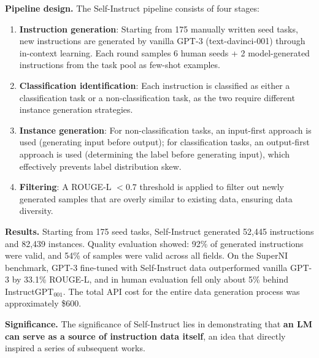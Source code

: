 \textbf{Pipeline design.}
The Self-Instruct pipeline consists of four stages:
\begin{enumerate}[leftmargin=1.5em]
  \item \textbf{Instruction generation}:
    Starting from 175 manually written seed tasks, new instructions are generated by
    vanilla GPT-3 (text-davinci-001) through in-context learning.
    Each round samples 6 human seeds + 2 model-generated instructions from the task pool as few-shot examples.

  \item \textbf{Classification identification}:
    Each instruction is classified as either a classification task or a non-classification task,
    as the two require different instance generation strategies.

  \item \textbf{Instance generation}:
    For non-classification tasks, an input-first approach is used (generating input before output);
    for classification tasks, an output-first approach is used (determining the label before generating input),
    which effectively prevents label distribution skew.

  \item \textbf{Filtering}:
    A ROUGE-L $< 0.7$ threshold is applied to filter out newly generated samples that are overly similar to existing data,
    ensuring data diversity.
\end{enumerate}

\textbf{Results.}
Starting from 175 seed tasks, Self-Instruct generated 52,445 instructions and 82,439 instances.
Quality evaluation showed: 92\% of generated instructions were valid, and 54\% of samples were valid across all fields.
On the SuperNI benchmark, GPT-3 fine-tuned with Self-Instruct data
outperformed vanilla GPT-3 by 33.1\% ROUGE-L,
and in human evaluation fell only about 5\% behind InstructGPT$_{\text{001}}$.
The total API cost for the entire data generation process was approximately \$600.

\textbf{Significance.}
The significance of Self-Instruct lies in demonstrating that \textbf{an LM can serve as a source of instruction data itself},
an idea that directly inspired a series of subsequent works.

